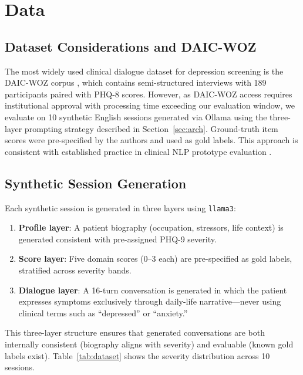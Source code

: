 \documentclass[11pt,twocolumn]{article}
\begin{document}
\section{Data}

\subsection{Dataset Considerations and DAIC-WOZ}

The most widely used clinical dialogue dataset for depression screening is the DAIC-WOZ corpus \citep{gratch2014distress}, which contains semi-structured interviews with 189 participants paired with PHQ-8 scores. However, as DAIC-WOZ access requires institutional approval with processing time exceeding our evaluation window, we evaluate on 10 synthetic English sessions generated via Ollama using the three-layer prompting strategy described in Section~\ref{sec:arch}. Ground-truth item scores were pre-specified by the authors and used as gold labels. This approach is consistent with established practice in clinical NLP prototype evaluation \citep{sehgal2025indian}.

\subsection{Synthetic Session Generation}

Each synthetic session is generated in three layers using \texttt{llama3}:
\begin{enumerate}
  \item \textbf{Profile layer}: A patient biography (occupation, stressors, life context) is generated consistent with pre-assigned PHQ-9 severity.
  \item \textbf{Score layer}: Five domain scores (0--3 each) are pre-specified as gold labels, stratified across severity bands.
  \item \textbf{Dialogue layer}: A 16-turn conversation is generated in which the patient expresses symptoms exclusively through daily-life narrative—never using clinical terms such as ``depressed'' or ``anxiety.''
\end{enumerate}

This three-layer structure ensures that generated conversations are both internally consistent (biography aligns with severity) and evaluable (known gold labels exist). Table~\ref{tab:dataset} shows the severity distribution across 10 sessions.
\end{document}
